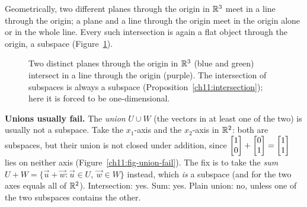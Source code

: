 Geometrically, two different planes through the origin in $\mathbb{R}^3$ meet in a line through
the origin; a plane and a line through the origin meet in the origin alone or in the whole
line. Every such intersection is again a flat object through the origin, a subspace
(Figure~\ref{ch11:fig-intersection}).

\begin{figure}[htbp]
\centering
{}
\caption{Two distinct planes through the origin in $\mathbb{R}^3$ (blue and green) intersect in a
line through the origin (purple). The intersection of subspaces is always a subspace
(Proposition~\ref{ch11:intersection}); here it is forced to be one-dimensional.}
\label{ch11:fig-intersection}
\end{figure}

\begin{trapbox}
\textbf{Unions usually fail.} The \emph{union} $U\cup W$ (the vectors in at least one of
the two) is usually not a subspace. Take the $x_1$-axis and the $x_2$-axis in $\mathbb{R}^2$:
both are subspaces, but their union is not closed under addition, since
$\begin{bmatrix}1\\0\end{bmatrix}+\begin{bmatrix}0\\1\end{bmatrix}=\begin{bmatrix}1\\1\end{bmatrix}$ lies on neither axis
(Figure~\ref{ch11:fig-union-fail}). The fix is to take
the \emph{sum} $U + W = \{\vec{u}+\vec{w} : \vec{u}\in U,\ \vec{w}\in W\}$ instead,
which \emph{is} a subspace (and for the two axes equals all of $\mathbb{R}^2$). Intersection: yes.
Sum: yes. Plain union: no, unless one of the two subspaces contains the other.
\end{trapbox}

